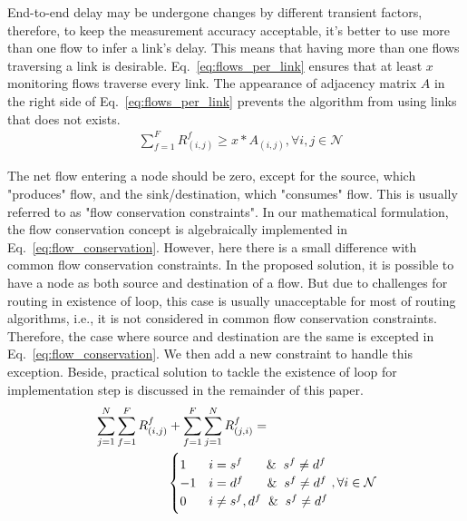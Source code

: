 \documentclass[10pt, journal, letterpaper]{IEEEtran}
\begin{document}
End-to-end delay may be undergone changes by different transient factors, therefore, to keep the measurement accuracy acceptable, it's better to use more than one flow to infer a link's delay. This means that having more than one flows traversing a link is desirable. Eq.~\ref{eq:flows_per_link} ensures that at least $x$ monitoring flows traverse every link. The appearance of adjacency matrix $A$ in the right side of Eq.~\ref{eq:flows_per_link} prevents the algorithm from using links that does not exists.
\begin{align}
    & \sum_{f=1}^{F}{R_{(i,j)}^{f}}\geq x*A_{(i,j)},   \forall i,j \in \mathcal{N} \label{eq:flows_per_link}
\end{align}

The net flow entering a node should be zero, except for the source, which "produces" flow, and the sink/destination, which "consumes" flow. This is usually referred to as "flow conservation constraints". In our mathematical formulation, the flow conservation concept is algebraically implemented in  Eq.~\ref{eq:flow_conservation}. However, here there is a small difference with common flow conservation constraints. In the proposed solution, it is possible to have a node as both source and destination of a flow. But due to challenges for routing in existence of loop, this case is usually unacceptable for most of routing algorithms, i.e., it is not considered in common flow conservation constraints. Therefore, the case where source and destination are the same is excepted in Eq.~\ref{eq:flow_conservation}. We then add a new constraint to handle this exception. Beside, practical solution to tackle the existence of loop for implementation step is discussed in the remainder of this paper.
\begin{align} \label{eq:flow_conservation}
    & \sum_{j=1}^N{\sum_{f=1}^F{R_{(i,j)}^{f}}}+\sum_{f=1}^F{\sum_{j=1}^N{R_{(j,i)}^{f}}}=\\\nonumber
    &~~~~~~~~~~~~~~~~~ \begin{cases}
                     1 & i=s^f~~~~ \And s^f\neq d^f\\
                    -1 & i=d^f~~~~ \And s^f\neq d^f\\
                     0 & i\neq s^f,d^f \And s^f\neq d^f\\
                    \end{cases},  \forall i \in \mathcal{N}
\end{align}
\end{document}

